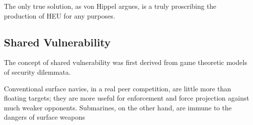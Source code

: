 \documentclass[letterpaper,12pt,twoside]{article} %
\begin{document}
\begin{multicols}{2}
The only true solution, as von Hippel\autocite{hippel2016banning} argues, is a truly proscribing the production of HEU for any purposes.

\subsection{Shared Vulnerability}

The concept of shared vulnerability was first derived from game theoretic models of security dilemmata.

Conventional surface navies, in a real peer competition, are little more than floating targets; they are more useful for enforcement and force projection against much weaker opponents. Submarines, on the other hand, are immune to the dangers of surface weapons



\end{multicols}
  \pagebreak

\nocite{philippe2014safeguarding}
\nocite{costa2017brazil}

\printbibliography[heading=bibintoc,title=Bibliography]


\end{document}

